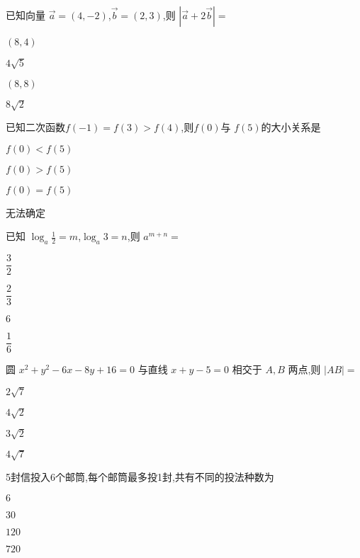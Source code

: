 \documentclass{exam-zh}
\begin{document}
    \begin{question}
    已知向量 $\vec{a}=(4,-2)$,$\vec{b}=(2,3)$,则 $|\vec{a} + 2\vec{b}|=$\paren[B]
    \begin{choices}
        \item $(8,4)$
        \item $4\sqrt{5}$
        \item $(8,8)$
        \item $8\sqrt{2}$
    \end{choices}
    \end{question}
    
    \begin{question}
    已知二次函数$f(-1)=f(3)>f(4)$,则$f(0)$与 $f(5)$的大小关系是\paren[A]
    \begin{choices}
        \item $f(0)<f(5)$
        \item   $f(0)>f(5)$
        \item   $f(0)=f(5)$
        \item   无法确定
    \end{choices}
    \end{question}
    
    \begin{question}
    已知 $\log_{a}\frac{1}{2}=m$,$\log_{a}3 = n$,则 $a^{m + n}=$\paren[A]
    \begin{choices}
        \item $\dfrac{3}{2}$
        \item $\dfrac{2}{3}$
        \item $6$
        \item $\dfrac{1}{6}$
    \end{choices}
    \end{question}
    
    \begin{question}
    圆 $x^2 + y^2 - 6x - 8y + 16 = 0$ 与直线 $x + y - 5 = 0$ 相交于 $A,B$ 两点,则 $|AB|=$\paren[A]
    \begin{choices}
        \item $2\sqrt{7}$
        \item $4\sqrt{2}$
        \item $3\sqrt{2}$
        \item $4\sqrt{7}$
    \end{choices}
    \end{question}
    
    \begin{question}
    5封信投入6个邮筒,每个邮筒最多投1封,共有不同的投法种数为\paren[D]
    \begin{choices}
        \item $6$
        \item $30$
        \item $120$
        \item $720$
    \end{choices}
    \end{question}
    
\end{document}
